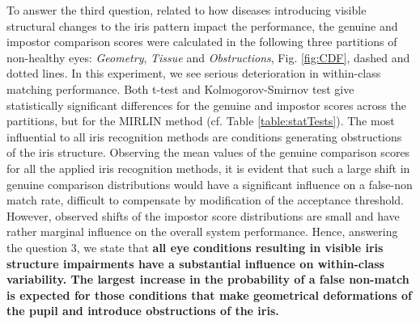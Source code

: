 \documentclass[10pt,twocolumn,letterpaper]{article}
\begin{document}
To answer the third question, related to how diseases introducing visible structural changes to the iris pattern impact the performance, the genuine and impostor comparison scores were calculated in the following three partitions of non-healthy eyes: \emph{Geometry}, \emph{Tissue} and \emph{Obstructions}, Fig. \ref{fig:CDF}, dashed and dotted lines. In this experiment, we see serious deterioration in within-class matching performance. Both t-test and Kolmogorov-Smirnov test give statistically significant differences for the genuine and impostor scores across the partitions, but for the MIRLIN method (cf. Table \ref{table:statTests}). The most influential to all iris recognition methods are conditions generating obstructions of the iris structure. Observing the mean values of the genuine comparison scores for all the applied iris recognition methods, it is evident that such a large shift in genuine comparison distributions would have a significant influence on a false-non match rate, difficult to compensate by modification of the acceptance threshold. However, observed shifts of the impostor score distributions are small and have rather marginal influence on the overall system performance. Hence, answering the question 3, we state that {\bf all eye conditions resulting in visible iris structure impairments have a substantial influence on within-class variability. The largest increase in the probability of a false non-match is expected for those conditions that make geometrical deformations of the pupil and introduce obstructions of the iris.}



\newlength{\colw}
\setlength{\colw}{0.965cm}
\end{document}
